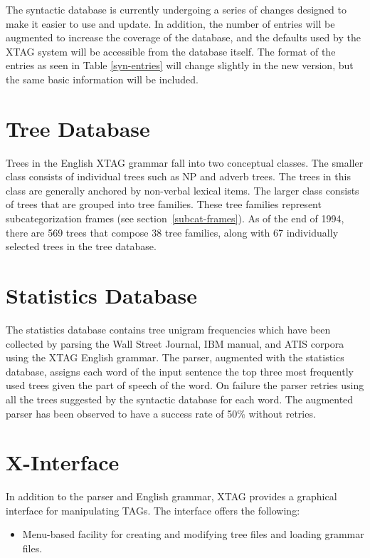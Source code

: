 {The syntactic database is currently undergoing a series of changes designed to
make it easier to use and update.  In addition, the number of entries will be
augmented to increase the coverage of the database, and the defaults used by
the XTAG system will be accessible from the database itself.  The format of the
entries as seen in Table \ref{syn-entries} will change slightly in the new
version, but the same basic information will be included.

\section{Tree Database} 
\label{tree-db}
Trees in the English XTAG grammar fall into two conceptual classes.  The
smaller class consists of individual trees such as NP and adverb trees.  The
trees in this class are generally anchored by non-verbal lexical items. The
larger class consists of trees that are grouped into tree families.  These tree
families represent subcategorization frames (see section~\ref{subcat-frames}).
As of the end of 1994, there are 569 trees that compose 38 tree families, along
with 67 individually selected trees in the tree database.


\section{Statistics Database}
\label{stat-db}
The statistics database contains tree unigram frequencies which have been
collected by parsing the Wall Street Journal, IBM manual, and ATIS corpora
using the XTAG English grammar. The parser, augmented with the statistics
database, assigns each word of the input sentence the top three most frequently
used trees given the part of speech of the word. On failure the parser retries
using all the trees suggested by the syntactic database for each word.  The
augmented parser has been observed to have a success rate of 50\% without
retries.

\section{X-Interface}

In addition to the parser and English grammar, XTAG provides a graphical
interface for manipulating TAGs.  The interface offers the following:

\begin{itemize}

\item Menu-based facility for creating and modifying tree files and 
loading grammar files.


\end{itemize}}

